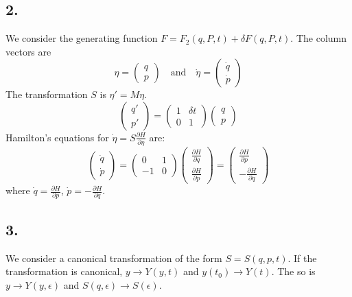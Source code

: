 \documentclass[12pt]{article}
\begin{document}
	\subsection*{2.}
	We consider the generating function $F = F_2(q, P, t) + \delta F(q, P, t)$. The column vectors are
	\[ \eta = \begin{pmatrix} q \\ p \end{pmatrix} \quad \text{and} \quad \dot{\eta} = \begin{pmatrix} \dot{q} \\ \dot{p} \end{pmatrix} \]
	The transformation $S$ is $\eta' = M \eta$.
	\[ \begin{pmatrix} q' \\ p' \end{pmatrix} = \begin{pmatrix} 1 & \delta t \\ 0 & 1 \end{pmatrix} \begin{pmatrix} q \\ p \end{pmatrix} \]
	Hamilton's equations for $\dot{\eta} = S\frac{\partial H}{\partial \eta}$ are:
	\[ \begin{pmatrix} \dot{q} \\ \dot{p} \end{pmatrix} = \begin{pmatrix} 0 & 1 \\ -1 & 0 \end{pmatrix} \begin{pmatrix} \frac{\partial H}{\partial q} \\ \frac{\partial H}{\partial p} \end{pmatrix} = \begin{pmatrix} \frac{\partial H}{\partial p} \\ -\frac{\partial H}{\partial q} \end{pmatrix} \]
	where $\dot{q} = \frac{\partial H}{\partial p}$, $\dot{p} = -\frac{\partial H}{\partial q}$.
	
	\subsection*{3.}
	We consider a canonical transformation of the form $S = S(q, p, t)$.
	If the transformation is canonical, $y \to Y(y, t)$ and $y(t_0) \to Y(t)$.
	The so is $y \to Y(y, \epsilon)$ and $S(q, \epsilon) \to S(\epsilon)$.
	
\end{document}
